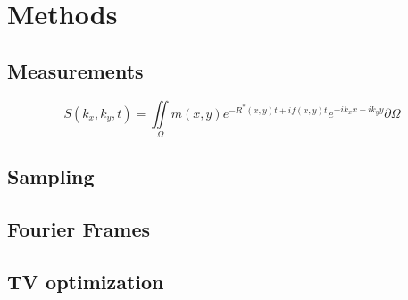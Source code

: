 \section{Methods}
\label{sec:methods}
\subsection{Measurements}

\begin{equation}
\label{eq:2Dhatf}
S(k_x,k_y,t) =  \iint\limits_{\Omega} m(x,y)e^{-R^*(x,y)t+if(x,y)t}e^{-ik_xx-ik_yy}\partial\Omega 
\end{equation}
\subsection{Sampling}
\subsection{Fourier Frames}
\subsection{TV optimization}